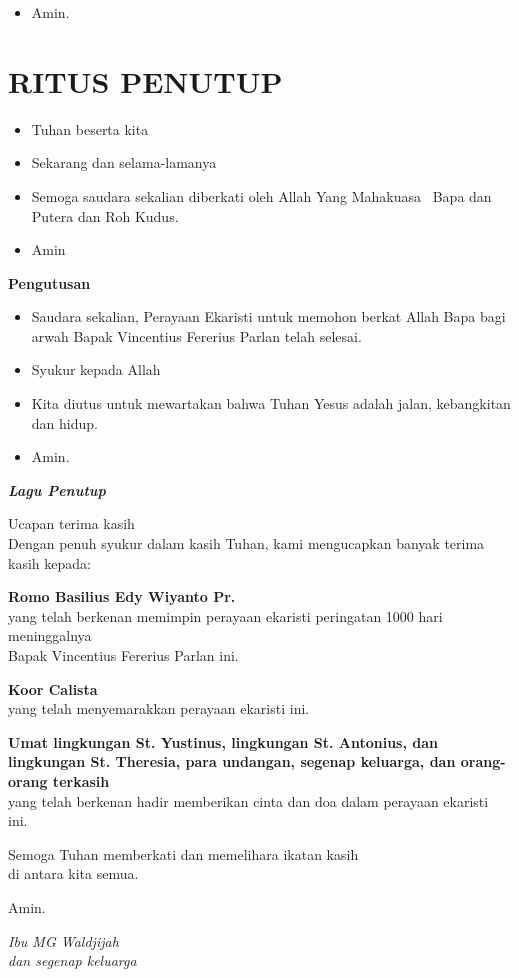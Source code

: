 \documentclass[titlepage,10pt,openany]{scrbook}
\makeatletter
\newcommand{\subjudul}[1]{%
  {\parindent \z@ 
    \interlinepenalty\@M \bfseries #1\par\nobreak \vskip 10\p@ }}
\newcommand{\lagu}[1]{%
  {\parindent \z@ 
    \interlinepenalty\@M \slshape \bfseries \normalsize \textit{#1}\par\nobreak \vskip 10\p@ }}
\newcommand{\BU}[1]{\begin{itemize} \item[U:] #1 \end{itemize}}
\newcommand{\BI}[1]{\begin{itemize} \item[I:] #1 \end{itemize}}
\newcommand{\namaalm}{Bapak Vincentius Fererius Parlan\xspace}
\newcommand{\namaromo}{Basilius Edy Wiyanto Pr.\xspace}
\makeatother
\begin{document}
\BU{Amin.}

\section*{RITUS PENUTUP}

\BI{Tuhan beserta kita}

\BU{Sekarang dan selama-lamanya}

\BI{Semoga saudara sekalian diberkati oleh Allah Yang 
Mahakuasa \Cross ~Bapa dan Putera dan Roh Kudus.}

\BU{Amin}

 

\subjudul{Pengutusan}

\BI{Saudara sekalian, Perayaan Ekaristi untuk memohon 
berkat Allah Bapa bagi arwah \namaalm telah selesai.}

\BU{Syukur kepada Allah}

\BI{Kita diutus untuk mewartakan bahwa Tuhan Yesus adalah 
jalan, kebangkitan dan hidup.}

\BU{Amin.}

 

\lagu{Lagu Penutup}

 

 

\newpage
\begin{flushright}
{\Large Ucapan terima kasih}\\
\noindent Dengan penuh syukur dalam kasih Tuhan, kami mengucapkan banyak
terima kasih kepada:
\large

\textbf{Romo \namaromo}\\
yang telah berkenan memimpin perayaan ekaristi peringatan 1000 hari meninggalnya\\ \namaalm
ini.

\textbf{Koor Calista}\\
yang telah menyemarakkan perayaan ekaristi ini.

\textbf{Umat lingkungan St. Yustinus, lingkungan St. Antonius, dan lingkungan St. Theresia, para undangan, segenap keluarga, dan orang-orang terkasih}\\
yang telah berkenan hadir memberikan cinta dan doa dalam perayaan
ekaristi ini.

Semoga Tuhan memberkati dan memelihara ikatan kasih\\ di antara kita semua.

Amin.

\bigskip 

\textit{Ibu MG Waldjijah\\
dan segenap keluarga}
\end{flushright}
\end{document}
